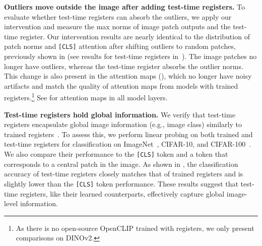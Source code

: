 \documentclass{article}
\begin{document}
\textbf{Outliers move outside the image after adding test-time registers.} To evaluate whether test-time registers can absorb the outliers, we apply our intervention and measure the max norms of image patch outputs and the test-time register. Our intervention results are nearly identical to the distribution of patch norms and \texttt{[CLS]} attention after shifting outliers to random patches, previously shown in  (see results for test-time registers in~). The image patches no longer have outliers, whereas the test-time register absorbs the outlier norms. This change is also present in the attention maps (), which no longer have noisy artifacts and match the quality of attention maps from models with trained registers.\footnote{As there is no open-source OpenCLIP trained with registers, we only present comparisons on DINOv2.} See  for attention maps in all model layers.



\textbf{Test-time registers hold global information.} We verify that test-time registers encapsulate global image information (e.g., image class) similarly to trained registers~\citep{darcet2024vision}. To assess this, we perform linear probing on both trained and test-time registers for classification on ImageNet~\citep{imagenet}, CIFAR-10, and CIFAR-100~\citep{krizhevsky2009learning}. We also compare their performance to the \texttt{[CLS]} token and a token that corresponds to a central patch in the image. As shown in , the classification accuracy of test-time registers closely matches that of trained registers and is slightly lower than the \texttt{[CLS]} token performance. These results suggest that test-time registers, like their learned counterparts, effectively capture global image-level information. 
\end{document}
